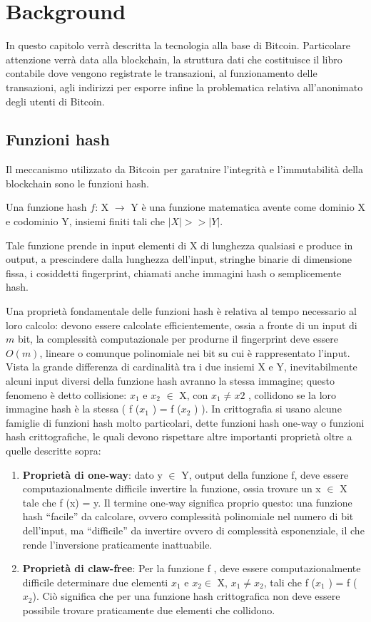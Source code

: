 \chapter{Background}
In questo capitolo verrà descritta la tecnologia alla base di Bitcoin. Particolare attenzione verrà data alla blockchain, la struttura dati che costituisce il libro contabile dove vengono registrate le transazioni, al funzionamento delle transazioni, agli indirizzi per esporre infine la problematica relativa all'anonimato degli utenti di Bitcoin. 
\section{Funzioni hash}
Il meccanismo utilizzato da Bitcoin per garatnire l'integrità e l'immutabilità della  blockchain sono le funzioni hash.

Una funzione hash $f$: X $\longrightarrow$ Y è una funzione matematica avente come dominio X e codominio Y, insiemi finiti tali che $|X| >> |Y |$.

Tale funzione prende in input elementi di X di lunghezza qualsiasi e produce in output, a prescindere dalla lunghezza dell’input, stringhe binarie di dimensione fissa, i cosiddetti fingerprint, chiamati anche immagini hash o semplicemente hash.

Una proprietà fondamentale delle funzioni hash è relativa al tempo necessario al loro calcolo: devono essere calcolate efficientemente, ossia a fronte di un input di $m$ bit, la complessità computazionale per produrne il fingerprint deve essere $O(m)$, lineare o comunque polinomiale nei bit su cui è rappresentato l’input.
Vista la grande differenza di cardinalità tra i due insiemi X e Y, inevitabilmente alcuni input diversi della funzione hash avranno la stessa immagine; questo fenomeno è detto collisione: $x_1$ e $x_2$ $\in$ X, con $x_1 \neq x2$ , collidono se la loro immagine hash è la stessa ( f ($x_1$ ) = f ($x_2$ ) ).
In crittografia si usano alcune famiglie di funzioni hash molto particolari, dette funzioni hash one-way o funzioni hash crittografiche, le quali devono rispettare altre importanti proprietà oltre a quelle descritte sopra:
\begin{enumerate}
    \item \textbf{Proprietà di one-way}: dato y $\in$ Y, output della funzione f, deve essere computazionalmente difficile invertire la funzione, ossia trovare un x $\in$ X tale che f (x) = y. Il termine one-way significa proprio questo: una funzione hash ``facile” da calcolare, ovvero complessità polinomiale nel numero di bit dell’input, ma ``difficile” da invertire ovvero di complessità esponenziale, il che rende l’inversione praticamente inattuabile.
    \item \textbf{Proprietà di claw-free}: Per la funzione f , deve essere computazionalmente difficile determinare due elementi $x_1$ e $x_2 \in$ X, $x_1 \neq x_2$, tali che f ($x_1$ ) = f ($x_2$). Ciò significa che per una funzione hash crittografica non deve essere possibile trovare praticamente due elementi che collidono.
\end{enumerate}
